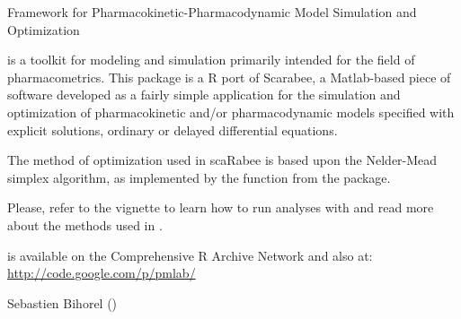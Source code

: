 %
\begin{Description}\relax
Framework for Pharmacokinetic-Pharmacodynamic Model Simulation and Optimization
\end{Description}
%
\begin{Details}\relax

 is a toolkit for modeling and simulation primarily intended for
the field
of pharmacometrics. This package is a R port of Scarabee, a Matlab-based piece of
software developed as a fairly simple application for the simulation and
optimization of pharmacokinetic and/or pharmacodynamic models specified
with explicit solutions, ordinary or delayed differential equations.

The method of optimization used in scaRabee is based upon the Nelder-Mead simplex
algorithm, as implemented by the  function from the
 package.

Please, refer to the vignette to learn how to run analyses with  and
read more about the methods used in .

 is  available on the Comprehensive R Archive Network and also at:
\url{http://code.google.com/p/pmlab/}

\end{Details}
%
\begin{Author}\relax
Sebastien Bihorel ()
\end{Author}
%
\begin{SeeAlso}\relax
{}
\end{SeeAlso}
